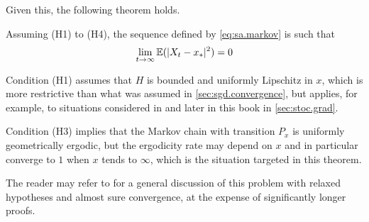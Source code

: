 Given this, the following theorem holds.
\begin{theorem}
\label{th:sgdm}
Assuming (H1) to (H4), the sequence defined by \cref{eq:sa.markov} is such that
\[
\lim_{t\to\infty} \bm{\mathbb E}(|X_t-x_*|^2) =0
\]
\end{theorem}

\begin{remark}
\label{rem:sgdm}
Condition (H1) assumes that $H$ is bounded and uniformly Lipschitz in $x$, which is more restrictive than what was assumed in \cref{sec:sgd.convergence}, but applies, for example, to situations considered in \citet{you88} and later in this book in \cref{sec:stoc.grad}. 

Condition (H3) implies that the Markov chain with transition $P_x$ is uniformly geometrically ergodic, but the ergodicity rate may depend on $x$ and in particular converge to $1$ when $x$ tends to $\infty$, which is the situation targeted in this theorem. 


The reader may refer to \cite{younes1999convergence} for a general discussion of this problem with relaxed hypotheses and almost sure convergence, at the expense of significantly longer proofs. 
\end{remark}

